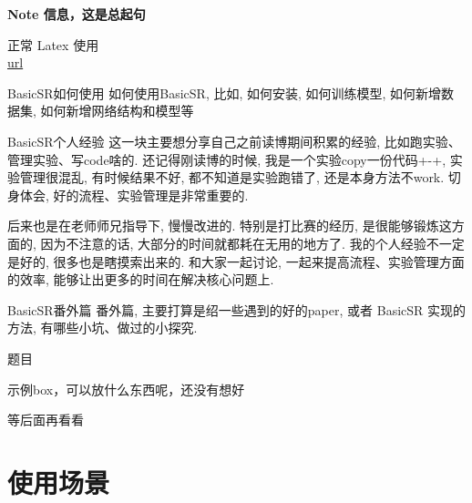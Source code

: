 \documentclass[../main.tex]{subfiles}
\begin{document}
\begin{note} 
	\textbf{Note 信息，这是总起句}
	
	正常 Latex 使用\\
	\href{http://xxx.com}{url}
\end{note}


BasicSR如何使用
如何使用BasicSR, 比如, 如何安装, 如何训练模型, 如何新增数据集, 如何新增网络结构和模型等

BasicSR个人经验
这一块主要想分享自己之前读博期间积累的经验, 比如跑实验、管理实验、写code啥的. 还记得刚读博的时候, 我是一个实验copy一份代码+-+, 实验管理很混乱, 有时候结果不好, 都不知道是实验跑错了, 还是本身方法不work. 切身体会, 好的流程、实验管理是非常重要的.

后来也是在老师师兄指导下, 慢慢改进的. 特别是打比赛的经历, 是很能够锻炼这方面的, 因为不注意的话, 大部分的时间就都耗在无用的地方了. 我的个人经验不一定是好的, 很多也是瞎摸索出来的. 和大家一起讨论, 一起来提高流程、实验管理方面的效率, 能够让出更多的时间在解决核心问题上.

BasicSR番外篇
番外篇, 主要打算是绍一些遇到的好的paper, 或者 BasicSR 实现的方法, 有哪些小坑、做过的小探究.

\begin{exampleBox}[righthand ratio=0.35, sidebyside, sidebyside align=center, lower separated=false]{题目}
	
	示例box，可以放什么东西呢，还没有想好
	
	等后面再看看



\end{exampleBox}


\section{使用场景}
\end{document}
